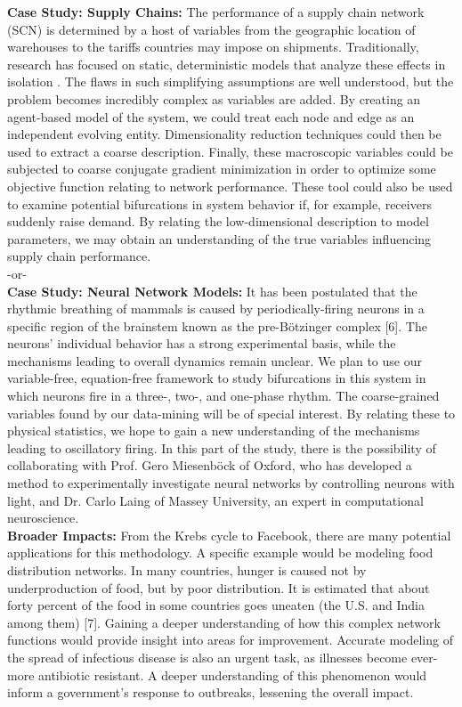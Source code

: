 \documentclass[11pt]{article}
\begin{document}
\textbf{Case Study: Supply Chains:} The performance of a supply chain network (SCN) is determined by a host of variables from the geographic location of warehouses to the tariffs countries may impose on shipments. Traditionally, research has focused on static, deterministic models that analyze these effects in isolation \cite{w.kilbi}. The flaws in such simplifying assumptions are well understood, but the problem becomes incredibly complex as variables are added. By creating an agent-based model of the system, we could treat each node and edge as an independent evolving entity. Dimensionality reduction techniques could then be used to extract a coarse description. Finally, these macroscopic variables could be subjected to coarse conjugate gradient minimization in order to optimize some objective function relating to network performance. These tool could also be used to examine potential bifurcations in system behavior if, for example, receivers suddenly raise demand. By relating the low-dimensional description to model parameters, we may obtain an understanding of the true variables influencing supply chain performance.\\
-or-
\\
\textbf{Case Study: Neural Network Models:} It has been postulated that the rhythmic breathing of mammals is caused by periodically-firing neurons in a specific region of the brainstem known as the pre-Bötzinger complex [6]. The neurons’ individual behavior has a strong experimental basis, while the mechanisms leading to overall dynamics remain unclear. We plan to use our variable-free, equation-free framework to study bifurcations in this system in which neurons fire in a three-, two-, and one-phase rhythm. The coarse-grained variables found by our data-mining will be of special interest. By relating these to physical statistics, we hope to gain a new understanding of the mechanisms leading to oscillatory firing. In this part of the study, there is the possibility of collaborating with Prof. Gero Miesenböck of Oxford, who has developed a method to experimentally investigate neural networks by controlling neurons with light, and Dr. Carlo Laing of Massey University, an expert in computational neuroscience.\\
\textbf{Broader Impacts:} From the Krebs cycle to Facebook, there are many potential applications for this methodology. A specific example would be modeling food distribution networks. In many countries, hunger is caused not by underproduction of food, but by poor distribution. It is estimated that about forty percent of the food in some countries goes uneaten (the U.S. and India among them) [7]. Gaining a deeper understanding of how this complex network functions would provide insight into areas for improvement. Accurate modeling of the spread of infectious disease is also an urgent task, as illnesses become ever-more antibiotic resistant. A deeper understanding of this phenomenon would inform a government’s response to outbreaks, lessening the overall impact.\\
\end{document}

